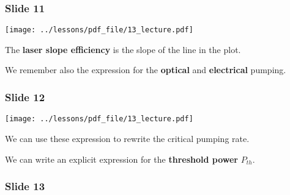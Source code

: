 \documentclass[../main/main.tex]{subfiles}
\begin{document}
\subsubsection*{Slide 11}

\begin{minipage}[]{0.5\linewidth}
\centering
\texttt{[image: ../lessons/pdf\_file/13\_lecture.pdf]}
\end{minipage}
\hspace{0.3cm}\vspace{0.3cm}
\begin{minipage}[c]{0.47\linewidth}

The \textbf{laser slope efficiency} is the slope of the line in the plot.

We remember also the expression for the \textbf{optical} and \textbf{electrical} pumping.

\end{minipage}

\subsubsection*{Slide 12}

\begin{minipage}[]{0.5\linewidth}
\centering
\texttt{[image: ../lessons/pdf\_file/13\_lecture.pdf]}
\end{minipage}
\hspace{0.3cm}\vspace{0.3cm}
\begin{minipage}[c]{0.47\linewidth}

We can use these expression to rewrite the critical pumping rate.

We can write an explicit expression for the \textbf{threshold power} \( P_{th} \).

\end{minipage}

\subsubsection*{Slide 13}
\end{document}
